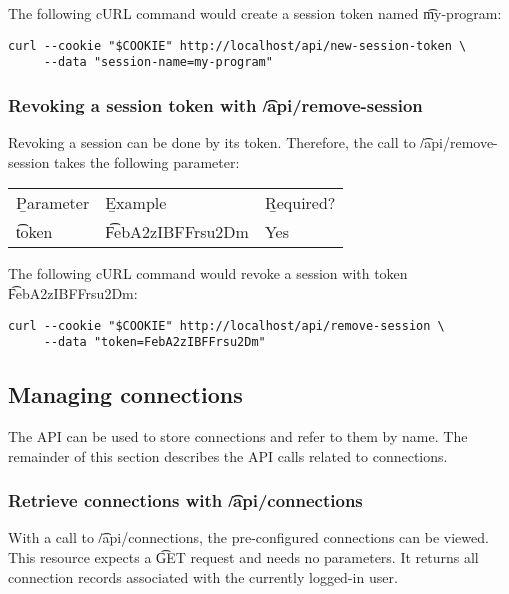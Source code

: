   The following cURL command would create a session token named
  \t{my-program}:

\begin{lstlisting}
curl --cookie "$COOKIE" http://localhost/api/new-session-token \
     --data "session-name=my-program"
\end{lstlisting}

\subsubsection{Revoking a session token with \t{/api/remove-session}}

  Revoking a session can be done by its token.  Therefore, the call to
  \t{/api/remove-session} takes the following parameter:

  \hypersetup{urlcolor=black}
  \begin{table}[H]
    \begin{tabularx}{\textwidth}{l!{\VRule[-1pt]}X!{\VRule[-1pt]}X}
      \headrow
      \b{Parameter} & \b{Example}          & \b{Required?}\\
      \evenrow
      \t{token}     & \t{FebA2zIBFFrsu2Dm} & Yes\\
    \end{tabularx}
  \end{table}
  \hypersetup{urlcolor=LinkGray}

  The following cURL command would revoke a session with token
  \t{FebA2zIBFFrsu2Dm}:

\begin{lstlisting}
curl --cookie "$COOKIE" http://localhost/api/remove-session \
     --data "token=FebA2zIBFFrsu2Dm"
\end{lstlisting}

\subsection{Managing connections}

  The API can be used to store connections and refer to them by name.  The
  remainder of this section describes the API calls related to connections.

\subsubsection{Retrieve connections with \t{/api/connections}}

  With a call to \t{/api/connections}, the pre-configured connections
  can be viewed.  This resource expects a \t{GET} request and needs no
  parameters.  It returns all connection records associated with the currently
  logged-in user.

